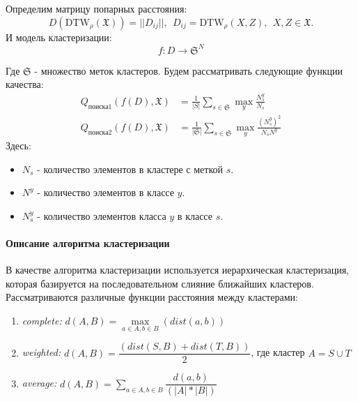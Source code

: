 \documentclass[12pt,twoside]{article}
\begin{document}
        Определим матрицу попарных расстояния:
        $$D(\text{DTW}_\rho(\mathfrak{X})) = ||D_{ij}||, \ \ D_{ij} = \text{DTW}_\rho(X, Z),\ \ X, Z \in \mathfrak{X}.$$
        И модель кластеризации:
        $$
            f: D \rightarrow \mathfrak{S}^N
        $$

        Где $\mathfrak{S}$ \-- множество меток кластеров.
        Будем рассматривать следующие функции качества:
        \begin{align*}
            Q_{\text{поиска} 1}(f(D), \mathfrak{X}) &= \frac{1}{|S|}\sum\limits_{s \in \mathfrak{S}} \max_y \frac{N_s^y}{N_s}  \\
            Q_{\text{поиска} 2}(f(D), \mathfrak{X}) &= \frac{1}{|\mathfrak{S}|}\sum\limits_{s \in \mathfrak{S}} \max_y \frac{(N_s^y)^2}{N_s N^y}
        \end{align*}
        Здесь: 
        \begin{itemize}[label=$\bullet$]
            \item $N_s$ \-- количество элементов в кластере с меткой $s$. 
            \item $N^y$ \-- количество элементов в классе $y$.
            \item $N_s^y$ \-- количество элементов класса $y$ в классе $s$.
        \end{itemize}

                

	\paragraph{Описание алгоритма кластеризации}      
        В качестве алгоритма кластеризации используется иерархическая кластеризация, которая базируется на последовательном слияние ближайших кластеров.
        Рассматриваются различные функции расстояния между кластерами: 
        \begin{enumerate}
            \item \textit{complete:}  $d(A, B) = \max\limits_{a \in A, b \in B}(dist(a, b))$ 
            \item \textit{weighted:}  $d(A,B) = \dfrac{(dist(S,B) + dist(T,B))}{2}$, где кластер $A = S \cup T$
            \item \textit{average:}   $d(A,B) = \sum\limits_{a \in A, b \in B} \dfrac{d(a, b)}{(|A|*|B|)}$ 
        \end{enumerate} 
                
\end{document}
